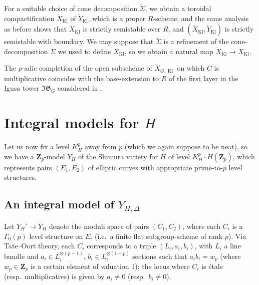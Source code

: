 \documentclass[cjm]{ipart}
\theoremstyle{plain}
\theoremstyle{remark}
\DeclareMathOperator{\Kl}{Kl}
\newcommand{\Zp}{\mathbf{Z}_p}
\newcommand{\into}{\hookrightarrow}
\numberwithin{equation}{subsection}
\begin{document}

  For a suitable choice of cone decomposition $\breve\Sigma$, we obtain a toroidal compactification $\breve{X}_{\Kl}$ of $\breve{Y}_{\Kl}$, which is a proper $R$-scheme; and the same analysis as before shows that $\breve{X}_{\Kl}$ is strictly semistable over $R$, and $(\breve{X}_{\Kl}, \breve{Y}_{\Kl})$ is strictly semistable with boundary. We may suppose that $\breve\Sigma$ is a refinement of the cone-decomposition $\Sigma$ we used to define $X_{\Kl}$, so we obtain a natural map $\breve{X}_{\Kl} \to X_{\Kl}$.

  \begin{remark}
   The $p$-adic completion of the open subscheme of $\breve{X}_{G, \Kl}$ on which $C$ is multiplicative coincides with the base-extension to $R$ of the first layer in the Igusa tower $\mathfrak{IG}_G$ considered in \cite{pilloni20,LPSZ1}.
  \end{remark}

\section{Integral models for \texorpdfstring{$H$}{H}}

 Let us now fix a level $K^p_H$ away from $p$ (which we again suppose to be neat), so we have a $\Zp$-model $Y_H$ of the Shimura variety for $H$ of level $K^p_H \cdot H(\Zp)$, which represents pairs $(E_1, E_2)$ of elliptic curves with appropriate prime-to-$p$ level structures.

 \subsection{An integral model of $Y_{H, \Delta}$}

  Let $Y_{H}' \to Y_H$ denote the moduli space of pairs $(C_1, C_2)$, where each $C_i$ is a $\Gamma_0(p)$ level structure on $E_i$ (i.e.~a finite flat subgroup-scheme of rank $p$). Via Tate--Oort theory, each $C_i$ corresponds to a triple $(L_i, a_i, b_i)$, with $L_i$ a line bundle and $a_i \in L_i^{\otimes (p-1)}$, $b_i \in L_i^{\otimes (1-p)}$ sections such that $a_i b_i = w_p$ (where $w_p \in \Zp$ is a certain element of valuation 1); the locus where $C_i$ is \'etale (resp.~multiplicative) is given by $a_i \ne 0$ (resp.~$b_i \ne 0$).
\end{document}
